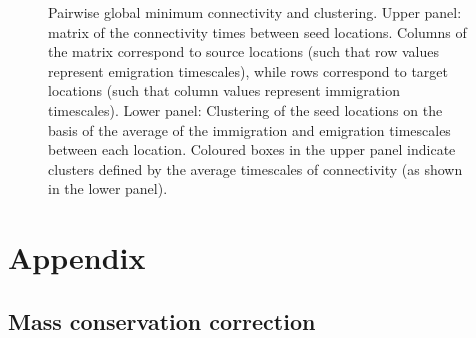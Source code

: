 \documentclass[12pt]{article}
\begin{document}
\begin{figure}[htp!]

\caption{Pairwise global minimum connectivity and clustering. Upper panel: matrix of the connectivity times between seed locations. Columns of the matrix correspond to source locations (such that row values represent emigration timescales), while rows correspond to target locations (such that column values represent immigration timescales). Lower panel: Clustering of the seed locations on the basis of the average of the immigration and emigration timescales between each location. Coloured boxes in the upper panel indicate clusters defined by the average timescales of connectivity (as shown in the lower panel).}
\label{connectivity_matrices}
\end{figure}












\clearpage 

\appendix

\section{Appendix}

\subsection{Mass conservation correction}
\end{document}
